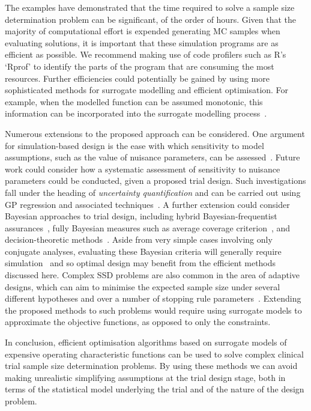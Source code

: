 \documentclass{article}
\begin{document}
The examples have demonstrated that the time required to solve a sample size determination problem can be significant, of the order of hours. Given that the majority of computational effort is expended generating MC samples when evaluating solutions, it is important that these simulation programs are as efficient as possible. We recommend making use of code profilers such as R's `Rprof' to identify the parts of the program that are consuming the most resources. Further efficiencies could potentially be gained by using more sophisticated methods for surrogate modelling and efficient optimisation. For example, when the modelled function can be assumed monotonic, this information can be incorporated into the surrogate modelling process~\cite{Emmerich2011}.

Numerous extensions to the proposed approach can be considered. One argument for simulation-based design is the ease with which sensitivity to model assumptions, such as the value of nuisance parameters, can be assessed~\cite{Landau2013}. Future work could consider how a systematic assessment of sensitivity to nuisance parameters could be conducted, given a proposed trial design. Such investigations fall under the heading of \emph{uncertainty quantification} and can be carried out using GP regression and associated techniques~\cite{Kennedy2001}. A further extension could consider Bayesian approaches to trial design, including hybrid Bayesian-frequentist assurances~\cite{OHagan2005}, fully Bayesian measures such as average coverage criterion~\cite{Cao2009}, and decision-theoretic methods~\cite{Oakley2010}. Aside from very simple cases involving only conjugate analyses, evaluating these Bayesian criteria will generally require simulation~\cite{OHagan2005} and so optimal design may benefit from the efficient methods discussed here. Complex SSD problems are also common in the area of adaptive designs, which can aim to minimise the expected sample size under several different hypotheses and over a number of stopping rule parameters~\cite{Wason2012}.  Extending the proposed methods to such problems would require using surrogate models to approximate the objective functions, as opposed to only the constraints.

In conclusion, efficient optimisation algorithms based on surrogate models of expensive operating characteristic functions can be used to solve complex clinical trial sample size determination problems. By using these methods we can avoid making unrealistic simplifying assumptions at the trial design stage, both in terms of the statistical model underlying the trial and of the nature of the design problem.
\end{document}
